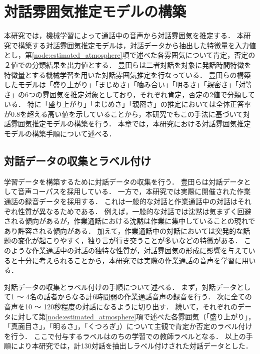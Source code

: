 \chapter{対話雰囲気推定モデルの構築\label{sec:develop_estimation_model}}
\thispagestyle{plain}

本研究では，機械学習によって通話中の音声から対話雰囲気を推定する．
本研究で構築する対話雰囲気推定モデルは，対話データから抽出した特徴量を入力値とし，第\ref{node:estimated_atmosphere}項で述べた各雰囲気について肯定，否定の２値での分類結果を出力値とする．
豊田らは二者対話を対象に発話時間特徴を特徴量とする機械学習を用いた対話雰囲気推定を行なっている\cite{Toyota}．
豊田らの構築したモデルは「盛り上がり」「まじめさ」「噛み合い」「明るさ」「親密さ」「対等さ」の6つの雰囲気を推定対象としており，それぞれ肯定，否定の2値で分類している．
特に「盛り上がり」「まじめさ」「親密さ」の推定においては全体正答率が0.8を超える高い値を示していることから，本研究でもこの手法に基づいて対話雰囲気推定モデルの構築を行う．
本章では，本研究における対話雰囲気推定モデルの構築手順について述べる．

\section{対話データの収集とラベル付け}

学習データを構築するために対話データの収集を行う．
豊田らは対話データとして音声コーパス\cite{PASD}を採用している．
一方で，本研究では実際に開催された作業通話の録音データを採用する．
これは一般的な対話と作業通話中の対話はそれぞれ性質が異なるためである．
例えば，一般的な対話では沈黙は気まずく回避される傾向があるが，作業通話における沈黙は作業に集中していることの現れであり許容される傾向がある．
加えて，作業通話中の対話においては突発的な話題の変化が起こりやすく，独り言が行き交うことが多いなどの特徴がある．
このような作業通話中の対話の独特な性質が，対話雰囲気の形成に影響を与えていると十分に考えられることから，本研究では実際の作業通話の音声を学習に用いる．

対話データの収集とラベル付けの手順について述べる．
まず，対話データとして1 〜 4名の話者からなる計6時間弱の作業通話音声の録音を行う．
次に全ての音声を10 〜 120秒程度の対話になるように切り出す．
続いて，それぞれのデータに対して第\ref{node:estimated_atmosphere}項で述べた各雰囲気（「盛り上がり」，「真面目さ」，「明るさ」，「くつろぎ」）について主観で肯定か否定のラベル付けを行う．
ここで付与するラベルはのちの学習での教師ラベルとなる．
以上の手順により本研究では，計130対話を抽出しラベル付けされた対話データとした．

